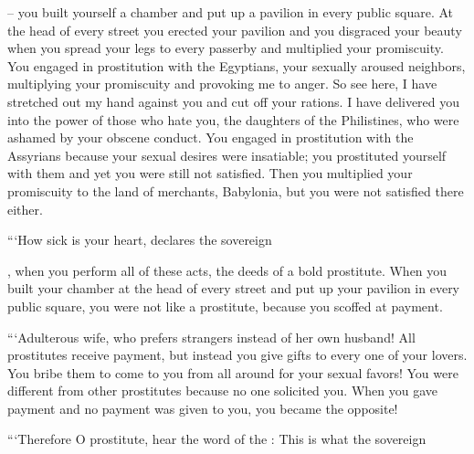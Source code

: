 {{} –
you built
yourself a chamber
and put up a pavilion
in every
public square.
At
the head
of every
street
you erected
your pavilion
and you disgraced
your beauty
when you spread
your legs
to every
passerby
and multiplied
your promiscuity.
You engaged in prostitution
with
the Egyptians,
your sexually aroused neighbors,
multiplying
your promiscuity
and provoking
me to anger.
So see here,
I have stretched
out my hand
against
you and cut off your rations.
I have delivered
you into the power of those
who hate
you, the daughters
of the Philistines,
who were ashamed
by
your obscene
conduct.
You engaged in prostitution
with
the Assyrians
because your sexual desires were insatiable;
you prostituted
yourself with them and yet
you were still not
satisfied.
Then you multiplied
your promiscuity
to
the land
of merchants,
Babylonia,
but you were not
satisfied
there
either.
\par }{\PP {}“‘How
sick
is your heart,
declares
the sovereign

{}, when you perform
all
of these
acts, the deeds
of a bold
prostitute.
When you built
your chamber
at the head
of every
street
and put up your pavilion
in every
public square,
you were not
like a prostitute,
because you scoffed
at payment.
\par }{\PP {}“‘Adulterous
wife,
who prefers
strangers
instead
of her
own husband!
All
prostitutes
receive
payment,
but instead you
give
gifts
to every one
of your lovers.
You bribe
them to come
to
you from all around
for your sexual favors!
You were
different
from
other prostitutes
because no one
solicited
you. When you gave
payment
and no
payment
was given
to you, you became
the opposite!
\par }{\PP {}“‘Therefore
O prostitute,
hear
the word
of the {}:
This is what
the sovereign

}
